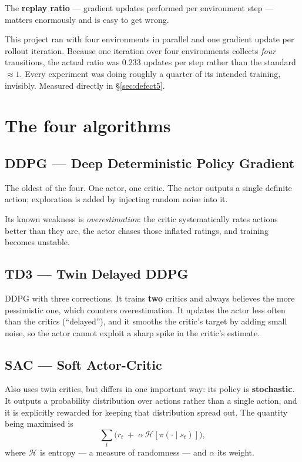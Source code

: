 The \textbf{replay ratio} --- gradient updates performed per environment step ---
matters enormously and is easy to get wrong.

\begin{trap}
This project ran with four environments in parallel and one gradient update per
rollout iteration. Because one iteration over four environments collects
\emph{four} transitions, the actual ratio was $0.233$ updates per step rather than
the standard $\approx 1$. Every experiment was doing roughly a quarter of its
intended training, invisibly. Measured directly in \S\ref{sec:defect5}.
\end{trap}

\section{The four algorithms}
\label{sec:sacdetail}

\subsection{DDPG --- Deep Deterministic Policy Gradient}

The oldest of the four. One actor, one critic. The actor outputs a single
definite action; exploration is added by injecting random noise into it.

Its known weakness is \emph{overestimation}: the critic systematically rates
actions better than they are, the actor chases those inflated ratings, and
training becomes unstable.

\subsection{TD3 --- Twin Delayed DDPG}

DDPG with three corrections. It trains \textbf{two} critics and always believes
the more pessimistic one, which counters overestimation. It updates the actor
less often than the critics (``delayed''), and it smooths the critic's target by
adding small noise, so the actor cannot exploit a sharp spike in the critic's
estimate.

\subsection{SAC --- Soft Actor-Critic}

Also uses twin critics, but differs in one important way: its policy is
\textbf{stochastic}. It outputs a probability distribution over actions rather
than a single action, and it is explicitly rewarded for keeping that distribution
spread out. The quantity being maximised is
\[
\sum_t \Big( r_t \;+\; \alpha\, \mathcal{H}[\pi(\cdot \mid s_t)] \Big),
\]
where $\mathcal{H}$ is entropy --- a measure of randomness --- and $\alpha$ its
weight.

